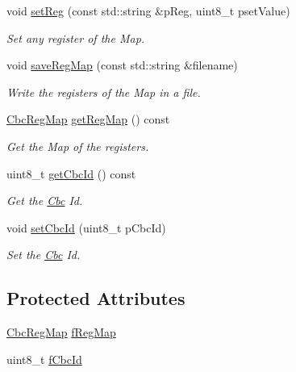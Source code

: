 \begin{CompactItemize}
void \hyperlink{class_ph2___hw_description_1_1_cbc_a5cd6d5dae570cebc56101c7871a0d7c}{set\-Reg} (const std::string \&p\-Reg, uint8\_\-t pset\-Value)
\begin{CompactList}\small\item\em Set any register of the Map. \item\end{CompactList}\item 
void \hyperlink{class_ph2___hw_description_1_1_cbc_1aa56daeee44f8ac84ebb23c0b5828cb}{save\-Reg\-Map} (const std::string \&filename)
\begin{CompactList}\small\item\em Write the registers of the Map in a file. \item\end{CompactList}\item 
\hyperlink{namespace_ph2___hw_description_9a23b373068f169aa67ca1d22c9a6001}{Cbc\-Reg\-Map} \hyperlink{class_ph2___hw_description_1_1_cbc_0aa8665c692683ff2317f80ed1c343c2}{get\-Reg\-Map} () const 
\begin{CompactList}\small\item\em Get the Map of the registers. \item\end{CompactList}\item 
uint8\_\-t \hyperlink{class_ph2___hw_description_1_1_cbc_fc5c714017832171dd0ca9a76dd9be94}{get\-Cbc\-Id} () const 
\begin{CompactList}\small\item\em Get the \hyperlink{class_ph2___hw_description_1_1_cbc}{Cbc} Id. \item\end{CompactList}\item 
void \hyperlink{class_ph2___hw_description_1_1_cbc_79864207a65830f49996220e612b00ae}{set\-Cbc\-Id} (uint8\_\-t p\-Cbc\-Id)
\begin{CompactList}\small\item\em Set the \hyperlink{class_ph2___hw_description_1_1_cbc}{Cbc} Id. \item\end{CompactList}\end{CompactItemize}
\subsection*{Protected Attributes}
\begin{CompactItemize}
\item 
\hyperlink{namespace_ph2___hw_description_9a23b373068f169aa67ca1d22c9a6001}{Cbc\-Reg\-Map} \hyperlink{class_ph2___hw_description_1_1_cbc_b4dbf1af172e821d95f77acb7e4fb962}{f\-Reg\-Map}
\item 
uint8\_\-t \hyperlink{class_ph2___hw_description_1_1_cbc_99b392306d4cdb7ffa7f956fc553011c}{f\-Cbc\-Id}
\end{CompactItemize}



